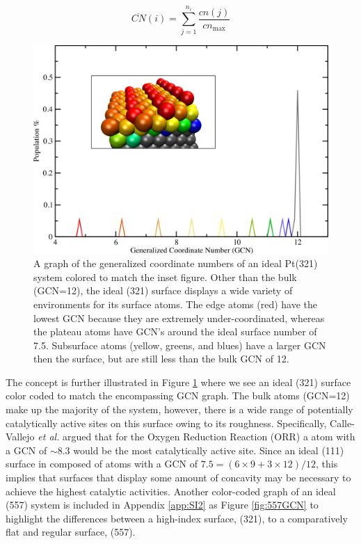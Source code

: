 \begin{equation}
  \overline{CN}(i) = \sum_{j=1}^{n_i}\frac{cn(j)}{cn_{\textrm{max}}}
  \label{eq:gcn}
\end{equation}

\begin{figure}[p!]
  \includegraphics[width=\linewidth]{../figures/chap4/321_ideal_gcn.pdf}
  \caption{A graph of the generalized coordinate numbers of an ideal Pt(321)
system colored to match the inset figure. Other than the bulk (GCN=12), the
ideal (321) surface displays a wide variety of environments for its surface
atoms.  The edge atoms (red) have the lowest GCN because they are extremely
under-coordinated, whereas the plateau atoms have GCN's around the ideal
surface number of 7.5. Subsurface atoms (yellow, greens, and blues) have a
larger GCN then the surface, but are still less than the bulk GCN of 12.  }
\label{fig:ideal321GCN}
\end{figure}

The concept is further illustrated in Figure \ref{fig:ideal321GCN} where we see
an ideal  (321) surface color coded to match the encompassing GCN graph.
The bulk atoms (GCN=12) make up the majority of the system, however, there is a
wide range of potentially catalytically active sites on this surface owing to
its roughness. Specifically, Calle-Vallejo {\em et al.} argued that for the
Oxygen Reduction Reaction (ORR) a  atom with a GCN of $\sim$8.3 would be the
most catalytically active site. Since an ideal (111) surface in composed of
atoms with a GCN of $7.5=(6\times9 + 3\times12)/12$, this implies that surfaces
that display some amount of concavity may be necessary to achieve the highest
catalytic activities. Another color-coded graph of an ideal  (557)
system is included in Appendix \ref{app:SI2} as Figure \ref{fig:557GCN} to highlight the
differences between a high-index surface, (321), to a comparatively flat and
regular surface, (557).

